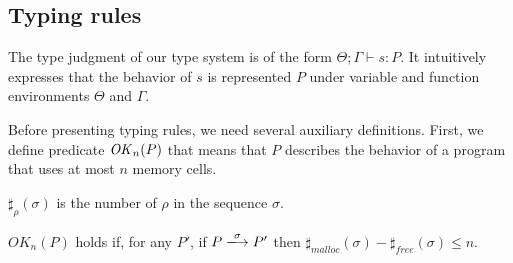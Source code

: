 
\subsection{Typing rules}

The type judgment of our type system is of the form $\Theta ; \Gamma
\vdash s : P$. It intuitively expresses that the behavior of $s$ is
represented $P$ under variable and function environments $\Theta$ and
$\Gamma$. 




Before presenting typing rules, we need several auxiliary definitions.
First, we define predicate \(\mathit{OK}_n(P)\) that means that \(P\)
describes the behavior of a program that uses at most \(n\) memory
cells.

\begin{myDef}[\(\sharp_{\rho}(\sigma)\)]
 \label{df:sharf}
\(\sharp_{\rho}(\sigma)\) is the number of \(\rho\) in the sequence
\(\sigma\).
\end{myDef}


\begin{myDef}
\label{df:okn}
\(OK_{n}(P)\) holds if, for any \(P'\), if \(P
\xlongrightarrow{\sigma}P'\) then
\(\sharp_{malloc}(\sigma)-\sharp_{free}(\sigma)\le n\).
\end{myDef}

